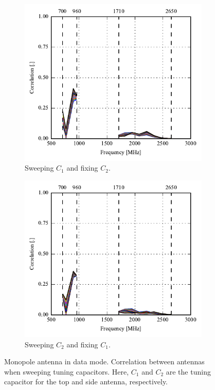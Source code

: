 \begin{figure}[htbp]
    \centering
    \begin{subfigure}{0.49\linewidth}
        \includegraphics{img/tech_sol/monopole/data_mode/s11_corr}
        \caption{Sweeping $C_1$ and fixing $C_2$.}
    \end{subfigure}
    \hfill
    \begin{subfigure}{0.49\linewidth}
        \includegraphics{img/tech_sol/monopole/data_mode/s22_corr}
        \caption{Sweeping $C_2$ and fixing $C_1$.}
    \end{subfigure}
    \caption{Monopole antenna in data mode. Correlation between antennas when sweeping tuning capacitors. Here, $C_1$ and $C_2$ are the tuning capacitor for the top and side antenna, respectively.}
    \label{fig:corr_sol1_data}
\end{figure}

